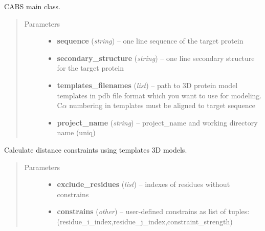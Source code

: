 \documentclass[letterpaper,10pt,english]{sphinxmanual}
\begin{document}
\begin{fulllineitems}
\label{api:pycabs.CABS}
CABS main class.
\begin{quote}\begin{description}
\item[{Parameters}] \leavevmode\begin{itemize}
\item {} 
\textbf{sequence} (\emph{string}) -- one line sequence of the target protein

\item {} 
\textbf{secondary\_structure} (\emph{string}) -- one line secondary structure for the target protein

\item {} 
\textbf{templates\_filenames} (\emph{list}) -- path to 3D protein model templates in pdb file format which you want to use for modeling. C\(\alpha\) numbering in templates must be aligned to target sequence

\item {} 
\textbf{project\_name} (\emph{string}) -- project\_name and working directory name (uniq)

\end{itemize}

\end{description}\end{quote}

\begin{fulllineitems}
\label{api:pycabs.CABS.calcConstraints}
Calculate distance constraints using templates 3D models.
\begin{quote}\begin{description}
\item[{Parameters}] \leavevmode\begin{itemize}
\item {} 
\textbf{exclude\_residues} (\emph{list}) -- indexes of residues without constrains

\item {} 
\textbf{constrains} (\emph{other}) -- user-defined constrains as list of tuples: (residue\_i\_index,residue\_j\_index,constraint\_strength)

\end{itemize}


\end{description}
\end{quote}
\end{fulllineitems}
\end{fulllineitems}
\end{document}
